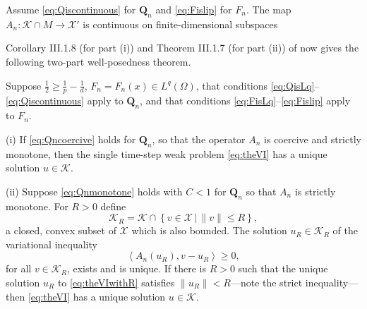 \documentclass[final,leqno,onefignum,onetabnum]{siamltex1213bueler}
\newcommand\bQ{\mathbf{Q}}
\newcommand{\ip}[2]{\ensuremath{\left<#1,#2\right>}}
\begin{document}
\medskip
\begin{lemma}  \label{lem:continuous}  Assume \eqref{eq:Qiscontinuous} for $\bQ_n$ and \eqref{eq:Fislip} for $F_n$.  The map $A_n : \mathcal{K}\cap M \to \mathcal{X}'$ is continuous on finite-dimensional subspaces
\end{lemma}

\medskip
Corollary III.1.8 (for part (i)) and Theorem III.1.7 (for part (ii)) of \cite{KinderlehrerStampacchia} now gives the following two-part well-posedness theorem.

\begin{theorem}  \label{thm:firstwellposed}  Suppose $\frac{1}{2} \ge \frac{1}{p} - \frac{1}{d}$, $F_n=F_n(x)\in L^q(\Omega)$, that conditions \eqref{eq:QisLq}--\eqref{eq:Qiscontinuous} apply to $\bQ_n$, and that conditions \eqref{eq:FisLq}--\eqref{eq:Fislip} apply to $F_n$.

(i)  If \eqref{eq:Qncoercive} holds for $\bQ_n$, so that the operator $A_n$ is coercive and strictly monotone, then the single time-step weak problem \eqref{eq:theVI} has a unique solution $u\in\mathcal{K}$.

(ii) Suppose \eqref{eq:Qnmonotone} holds with $C<1$ for $\bQ_n$ so that $A_n$ is strictly monotone.  For $R>0$ define
    $$\mathcal{K}_R = \mathcal{K} \cap \left\{v\in \mathcal{X} \,\Big|\, \|v\|\le R\right\},$$
a closed, convex subset of $\mathcal{X}$ which is also bounded.  The solution $u_R\in \mathcal{K}_R$ of the variational inequality
\begin{equation}
  \ip{A_n(u_R)}{v-u_R} \ge 0, \label{eq:theVIwithR}
\end{equation}
for all $v \in \mathcal{K}_R$, exists and is unique.  If there is $R>0$ such that the unique solution $u_R$ to \eqref{eq:theVIwithR} satisfies $\|u_R\| < R$---note the strict inequality---then \eqref{eq:theVI} has a unique solution $u\in\mathcal{K}$.
\end{theorem}
\end{document}
